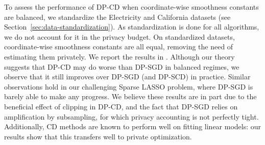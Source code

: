To assess the performance of DP-CD when coordinate-wise smoothness
constants are balanced, we standardize the Electricity and California
datasets (see Section~\ref{sec:data-standardization}).  As
standardization is done for all algorithms, we do not account for it
in the privacy budget. On standardized datasets, coordinate-wise
smoothness constants are all equal, removing the need of estimating
them privately. We report the results in .
Although our theory suggests that DP-CD may do worse than DP-SGD in
balanced regimes, we observe that it still improves over DP-SGD (and
DP-SCD) in practice. Similar observations hold in our challenging
Sparse LASSO problem, where DP-SGD is barely able to make any
progress. We believe these results are in part due to the beneficial
effect of clipping in DP-CD, and the fact that DP-SGD relies on
amplification by subsampling, for which privacy accounting is not
perfectly tight. Additionally, CD methods are known to perform well on
fitting linear models: our results show that this transfers well to
private optimization.

